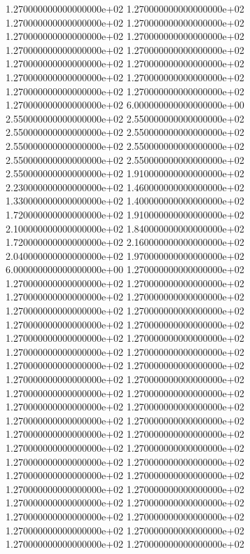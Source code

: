 1.270000000000000000e+02 1.270000000000000000e+02 1.270000000000000000e+02 1.270000000000000000e+02 1.270000000000000000e+02 1.270000000000000000e+02 1.270000000000000000e+02 1.270000000000000000e+02 1.270000000000000000e+02 1.270000000000000000e+02 1.270000000000000000e+02 1.270000000000000000e+02 1.270000000000000000e+02 1.270000000000000000e+02 1.270000000000000000e+02 6.000000000000000000e+00 2.550000000000000000e+02 2.550000000000000000e+02 2.550000000000000000e+02 2.550000000000000000e+02 2.550000000000000000e+02 2.550000000000000000e+02 2.550000000000000000e+02 2.550000000000000000e+02 2.550000000000000000e+02 1.910000000000000000e+02 2.230000000000000000e+02 1.460000000000000000e+02 1.330000000000000000e+02 1.400000000000000000e+02 1.720000000000000000e+02 1.910000000000000000e+02 2.100000000000000000e+02 1.840000000000000000e+02 1.720000000000000000e+02 2.160000000000000000e+02 2.040000000000000000e+02 1.970000000000000000e+02 6.000000000000000000e+00 1.270000000000000000e+02 1.270000000000000000e+02 1.270000000000000000e+02 1.270000000000000000e+02 1.270000000000000000e+02 1.270000000000000000e+02 1.270000000000000000e+02 1.270000000000000000e+02 1.270000000000000000e+02 1.270000000000000000e+02 1.270000000000000000e+02 1.270000000000000000e+02 1.270000000000000000e+02 1.270000000000000000e+02 1.270000000000000000e+02 1.270000000000000000e+02 1.270000000000000000e+02 1.270000000000000000e+02 1.270000000000000000e+02 1.270000000000000000e+02 1.270000000000000000e+02 1.270000000000000000e+02 1.270000000000000000e+02 1.270000000000000000e+02 1.270000000000000000e+02 1.270000000000000000e+02 1.270000000000000000e+02 1.270000000000000000e+02 1.270000000000000000e+02 1.270000000000000000e+02 1.270000000000000000e+02 1.270000000000000000e+02 1.270000000000000000e+02 1.270000000000000000e+02 1.270000000000000000e+02 1.270000000000000000e+02 1.270000000000000000e+02 1.270000000000000000e+02 1.270000000000000000e+02 1.270000000000000000e+02 1.270000000000000000e+02
